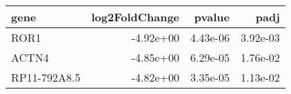 \begin{tabular}{lrrr}
\toprule
        gene &  log2FoldChange &   pvalue &     padj \\
\midrule
        ROR1 &       -4.92e+00 & 4.43e-06 & 3.92e-03 \\
       ACTN4 &       -4.85e+00 & 6.29e-05 & 1.76e-02 \\
RP11-792A8.5 &       -4.82e+00 & 3.35e-05 & 1.13e-02 \\
\bottomrule
\end{tabular}
